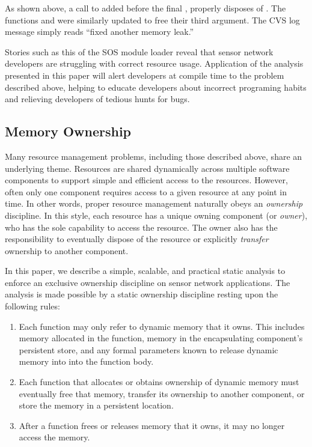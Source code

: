 As shown above, a call to  added before the final
, properly disposes of .
%
The functions  and  were
similarly updated to free their third argument.  
%
The CVS log message simply reads ``fixed another memory leak.''



Stories such as this of the SOS module loader reveal that sensor network
developers are struggling with correct resource usage.
%
Application of the analysis presented in this paper will alert developers at
compile time to the problem described above, helping to educate developers
about incorrect programing habits and relieving developers of tedious hunts
for bugs.



\subsection{Memory Ownership}
\label{subsec:owner}



Many resource management problems, including those described above, share an
underlying theme.  
%
Resources are shared dynamically across multiple software components to
support simple and efficient access to the resources.  
%
However, often only one component requires access to a given resource at any
point in time.  
%
In other words, proper resource management naturally obeys an {\em ownership}
discipline.  
%
In this style, each resource has a unique owning component (or {\em owner}),
who has the sole capability to access the resource.  
%
The owner also has the responsibility to eventually dispose of the resource or
explicitly {\em transfer} ownership to another component.



In this paper, we describe a simple, scalable, and practical static analysis
to enforce an exclusive ownership discipline on sensor network applications.
%
The analysis is made possible by a static ownership discipline resting upon
the following rules:

\begin{enumerate}
%
\item Each function may only refer to dynamic memory that it owns.  This
includes memory allocated in the function, memory in the encapsulating
component's persistent store, and any formal parameters known to release
dynamic memory into into the function body.
%
\item Each function that allocates or obtains ownership of dynamic memory must
eventually free that memory, transfer its ownership to another component, or
store the memory in a persistent location.
%
\item After a function frees or releases memory that it owns, it may no longer
access the memory.
%
\end{enumerate}



